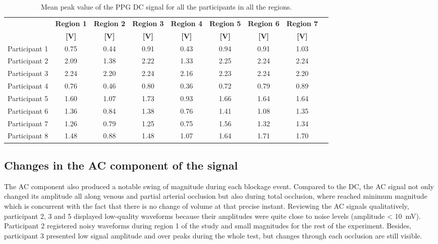 \begin{table}[!htbp]
	\caption[Mean peak value of the PPG DC signal for all participants in all regions]{Mean peak value of the PPG DC signal for all the participants in all the regions.}
	\label{tbl:PPG RED-DC}
	\centering \small
	\begin{tabular}{p{1.9cm}cccccccc}
		\toprule
		& \textbf{Region 1}
		& \textbf{Region 2}
		& \textbf{Region 3}
		& \textbf{Region 4}
		& \textbf{Region 5}
		& \textbf{Region 6}
		& \textbf{Region 7} \\
		& \textbf{[\si{\volt}]}
		& \textbf{[\si{\volt}]}
		& \textbf{[\si{\volt}]}		
		& \textbf{[\si{\volt}]}		
		& \textbf{[\si{\volt}]}
		& \textbf{[\si{\volt}]}
		& \textbf{[\si{\volt}]}\\\midrule
		Participant 1 & 0.75 & 0.44 & 0.91 & 0.43 & 0.94 & 0.91 & 1.03 \\  
		Participant 2 & 2.09 & 1.38 & 2.22 & 1.33 & 2.25 & 2.24 & 2.24 \\  
		Participant 3 & 2.24 & 2.20 & 2.24 & 2.16 & 2.23 & 2.24 & 2.20 \\  
		Participant 4 & 0.76 & 0.46 & 0.80 & 0.36 & 0.72 & 0.79 & 0.89 \\  
		Participant 5 & 1.60 & 1.07 & 1.73 & 0.93 & 1.66 & 1.64 & 1.64 \\  
		Participant 6 & 1.36 & 0.84 & 1.38 & 0.76 & 1.41 & 1.08 & 1.35 \\  
		Participant 7 & 1.26 & 0.79 & 1.25 & 0.75 & 1.56 & 1.32 & 1.34 \\  
		Participant 8 & 1.48 & 0.88 & 1.48 & 1.07 & 1.64 & 1.71 & 1.70 \\  
		\bottomrule
	\end{tabular}
\end{table}

\subsection{Changes in the AC component of the signal}
\label{section comparison 4.2}
The AC component also produced a notable swing of magnitude during each blockage event. Compared to the DC, the AC signal not only changed its amplitude all along venous and partial arterial occlusion but also during total occlusion, where reached minimum magnitude which is concurrent with the fact that there is no change of volume at that precise instant. Reviewing the AC signals qualitatively, participant 2, 3 and 5 displayed low-quality waveforms because their amplitudes were quite close to noise levels  (amplitude < \SI{10}{\milli\volt}).   Participant 2 registered noisy waveforms during region 1 of the study and small magnitudes for the rest of the experiment. Besides, participant 3 presented low signal amplitude and over peaks during the whole test, but changes through each occlusion are still visible.

